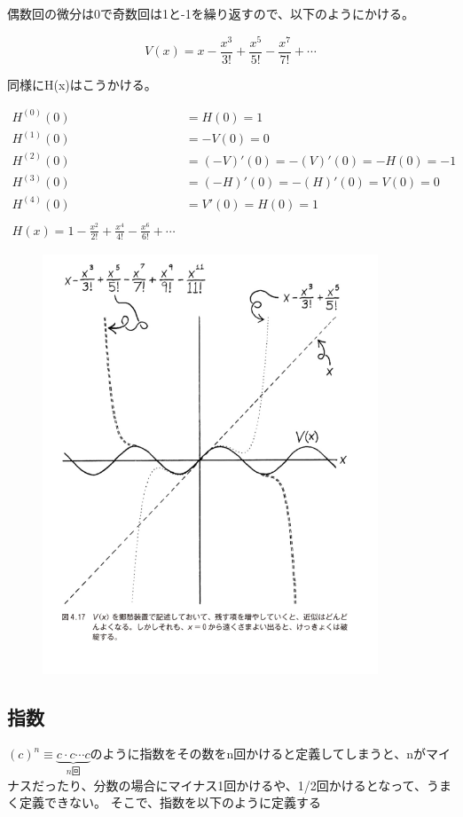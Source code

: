 \documentclass[dvipdfmx]{jsarticle}
\begin{document}
偶数回の微分は0で奇数回は1と-1を繰り返すので、以下のようにかける。

\[ V(x) = x - \frac{x^3}{3!} + \frac{x^5}{5!} - \frac{x^7}{7!} + \cdots \]

同様にH(x)はこうかける。

\begin{align*}
H^{(0)}(0) &= H(0) = 1 \\
H^{(1)}(0) &= -V(0) = 0 \\
H^{(2)}(0) &= (-V)'(0) = -(V)'(0) = -H(0) = -1 \\
H^{(3)}(0) &= (-H)'(0) = -(H)'(0) = V(0) = 0 \\
H^{(4)}(0) &= V'(0) = H(0) = 1 \\
\\
H(x) = 1 - \frac{x^2}{2!} + \frac{x^4}{4!} - \frac{x^6}{6!} + \cdots
\end{align*}

\begin{figure}[h]
  \centering
  \includegraphics[width=10cm]{images/burn_math_4-17.png}
\end{figure}

\subsection{指数}

$(c)^n \equiv \underbrace{c \cdot c \cdots c}_{n回}$のように指数をその数をn回かけると定義してしまうと、nがマイナスだったり、分数の場合にマイナス1回かけるや、1/2回かけるとなって、うまく定義できない。 そこで、指数を以下のように定義する
\end{document}
